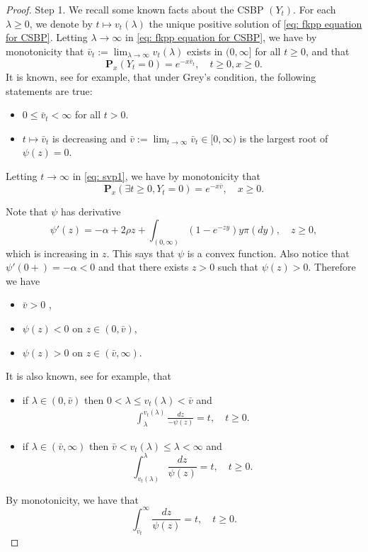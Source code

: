 \documentclass[12pt,a4paper]{amsart}
\theoremstyle{plain}
\theoremstyle{definition}
\numberwithin{equation}{section}
\begin{document}
\begin{proof}
    Step 1. We recall some known facts about the CSBP $(Y_t)$.
       For each $\lambda \geq 0$, we denote by $t\mapsto v_t(\lambda)$ the unique positive solution of \eqref{eq: fkpp equation for CSBP}.
    Letting $\lambda \to \infty$ in \eqref{eq: fkpp equation for CSBP}, we have by monotonicity that $\bar v_t:= \lim_{\lambda \to \infty}v_t(\lambda)$ exists in $(0,\infty]$ for all $t\geq 0$, and that
\begin{equation}
\label{eq: svp1}
    \mathbf P_x(Y_t = 0)=e^{-x\bar v_t}, \quad t\geq 0, x\ge 0.
\end{equation}
    It is known, see \cite[Theorems 3.5-3.8]{Li2011Measure-valued} for example, that under Grey's condition, the following statements are true:
\begin{itemize}
\item
    $0\leq \bar v_t < \infty$ for all $t>0$.
\item
    $t\mapsto \bar v_t$ is decreasing and $\bar v:= \lim_{t\to \infty} \bar v_t \in [0,\infty)$ is the largest root of $\psi(z) = 0$.
\end{itemize}
    Letting $t \to \infty$ in \eqref{eq: svp1}, we have by monotonicity that
\[
    \mathbf P_x(\exists t \geq 0, Y_t = 0)
    = e^{-x\bar v}, \quad x\geq 0.
\]

    Note that $\psi$ has derivative
\[
    \psi'(z)
    = -\alpha + 2\rho z + \int_{(0,\infty)}(1-e^{-zy})y\pi(dy),\quad z\geq 0,
\]
    which is increasing in $z$.
    This says that $\psi$ is a convex function.
    Also notice that $\psi'(0+)=-\alpha <0$ and that there exists $z>0$ such that $\psi(z)>0$.
    Therefore we have
\begin{itemize}
\item
    $\bar v > 0$ ,
\item
    $\psi(z) < 0$ on $z\in (0,\bar v)$,
\item
    $\psi(z) > 0 $ on $z\in (\bar v, \infty)$.
\end{itemize}
    It is also known, see \cite[Proposition 3.3]{Li2011Measure-valued} for example, that
\begin{itemize}
\item
    if $\lambda \in (0,\bar v)$ then $0<\lambda \leq v_t(\lambda)<\bar v $ and
\begin{align}
\label{CSBP: int}
    \int_{\lambda}^{v_t(\lambda)} \frac{dz}{-\psi(z)} = t, \quad t\geq 0.
\end{align}
\item
    if $\lambda \in (\bar v, \infty)$ then $\bar v < v_t(\lambda)\leq \lambda< \infty $ and
\[
  \int_{v_t(\lambda)}^\lambda\frac{dz}{\psi(z)} = t, \quad t\geq 0.
\]
\end{itemize}
    By monotonicity, we have that
\begin{equation}
\label{eq:svp2}
    \int_{\bar v_t}^\infty \frac{dz}{\psi(z)} = t, \quad t\geq 0.
\end{equation}


\end{proof}
\end{document}
